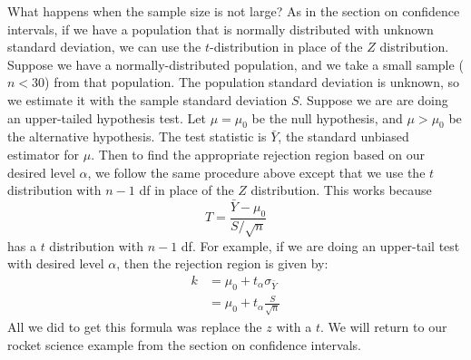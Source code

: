 \documentclass[notes.tex]{subfiles}
\begin{document}
What happens when the sample size is not large? As in the section on confidence intervals, if we have a population that is normally distributed with unknown standard deviation, we can use the $t$-distribution in place of the $Z$ distribution. Suppose we have a normally-distributed population, and we take a small sample ($n < 30$) from that population. The population standard deviation is unknown, so we estimate it with the sample standard deviation $S$. Suppose we are are doing an upper-tailed hypothesis test. Let $\mu = \mu_0$ be the null hypothesis, and $\mu > \mu_0$ be the alternative hypothesis. The test statistic is $\bar{Y}$, the standard unbiased estimator for $\mu$. Then to find the appropriate rejection region based on our desired level $\alpha$, we follow the same procedure above except that we use the $t$ distribution with $n-1$ df in place of the $Z$ distribution. This works because
\[
T = \frac{ \bar{Y} - \mu_0}{S/\sqrt{n}}
\]
has a $t$ distribution with $n-1$ df. For example, if we are doing an upper-tail test with desired level $\alpha$, then the rejection region is given by:
\begin{align*}
k &= \mu_0 + t_\alpha \sigma_{\bar{Y}}\\
&= \mu_0 + t_\alpha \frac{S}{\sqrt{n}}
\end{align*}
All we did to get this formula was replace the $z$ with a $t$. We will return to our rocket science example from the section on confidence intervals.
\end{document}
